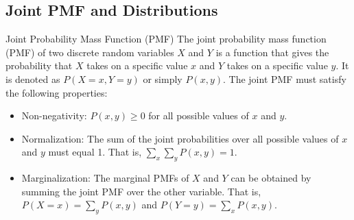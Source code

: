 \documentclass[openany]{book}
\begin{document}
\subsection{Joint PMF and Distributions}
\begin{mydefinition}{Joint Probability Mass Function (PMF)}
    The joint probability mass function (PMF) of two discrete random variables $X$ and $Y$ is a function that gives the probability that $X$ takes on a specific value $x$ and $Y$ takes on a specific value $y$. It is denoted as $P(X = x, Y = y)$ or simply $P(x, y)$. The joint PMF must satisfy the following properties:
    \begin{itemize}
        \item Non-negativity: $P(x, y) \geq 0$ for all possible values of $x$ and $y$.
        \item Normalization: The sum of the joint probabilities over all possible values of $x$ and $y$ must equal 1. That is, $\sum_{x} \sum_{y} P(x, y) = 1$.
        \item Marginalization: The marginal PMFs of $X$ and $Y$ can be obtained by summing the joint PMF over the other variable. That is, $P(X = x) = \sum_{y} P(x, y)$ and $P(Y = y) = \sum_{x} P(x, y)$.
    \end{itemize}
\end{mydefinition}
\end{document}
